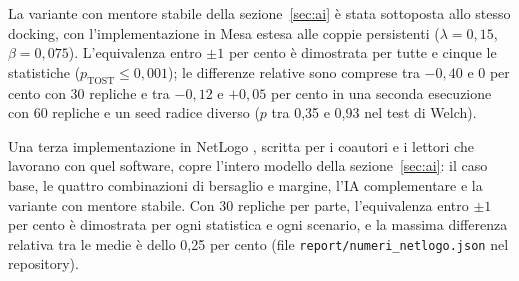 \documentclass[preprint,12pt,authoryear]{elsarticle}
\begin{document}
\begin{table}[h]\centering\small
\caption{Docking: implementazione vettorizzata (NumPy) contro implementazione a oggetti (Mesa) ($N=5.000$, 30 repliche ciascuna).}\label{tab:docking}
\end{table}

La variante con mentore stabile della sezione~\ref{sec:ai} è stata sottoposta allo stesso docking, con l'implementazione in Mesa estesa alle coppie persistenti ($\lambda=0{,}15$, $\beta=0{,}075$). L'equivalenza entro $\pm1$ per cento è dimostrata per tutte e cinque le statistiche ($p_{\mathrm{TOST}}\le0{,}001$); le differenze relative sono comprese tra $-0{,}40$ e $0$ per cento con 30 repliche e tra $-0{,}12$ e $+0{,}05$ per cento in una seconda esecuzione con 60 repliche e un seed radice diverso ($p$ tra 0,35 e 0,93 nel test di Welch).

Una terza implementazione in NetLogo \citep{Wilensky1999}, scritta per i coautori e i lettori che lavorano con quel software, copre l'intero modello della sezione~\ref{sec:ai}: il caso base, le quattro combinazioni di bersaglio e margine, l'IA complementare e la variante con mentore stabile. Con 30 repliche per parte, l'equivalenza entro $\pm1$ per cento è dimostrata per ogni statistica e ogni scenario, e la massima differenza relativa tra le medie è dello 0,25 per cento (file \texttt{report/numeri\_netlogo.json} nel repository).



\end{document}
